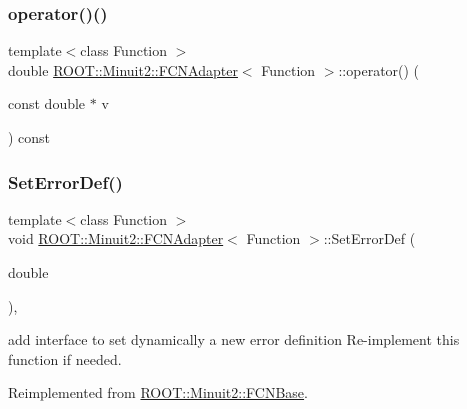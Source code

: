 \subsubsection{\texorpdfstring{operator()()}{operator()()}\hspace{0.1cm}{\footnotesize\ttfamily [4/4]}}
{\footnotesize\ttfamily template$<$class Function $>$ \\
double \mbox{\hyperlink{classROOT_1_1Minuit2_1_1FCNAdapter}{R\+O\+O\+T\+::\+Minuit2\+::\+F\+C\+N\+Adapter}}$<$ Function $>$\+::operator() (\begin{DoxyParamCaption}\item[{const double $\ast$}]{v }\end{DoxyParamCaption}) const\hspace{0.3cm}{\ttfamily [inline]}}

\mbox{\label{classROOT_1_1Minuit2_1_1FCNAdapter_ad87419db3f1d4764497f52487fef6fc8}} 
\subsubsection{\texorpdfstring{SetErrorDef()}{SetErrorDef()}\hspace{0.1cm}{\footnotesize\ttfamily [1/2]}}
{\footnotesize\ttfamily template$<$class Function $>$ \\
void \mbox{\hyperlink{classROOT_1_1Minuit2_1_1FCNAdapter}{R\+O\+O\+T\+::\+Minuit2\+::\+F\+C\+N\+Adapter}}$<$ Function $>$\+::Set\+Error\+Def (\begin{DoxyParamCaption}\item[{double}]{ }\end{DoxyParamCaption})\hspace{0.3cm}{\ttfamily [inline]}, {\ttfamily [virtual]}}

add interface to set dynamically a new error definition Re-\/implement this function if needed. 

Reimplemented from \mbox{\hyperlink{classROOT_1_1Minuit2_1_1FCNBase_a840e02c2e6ef96eec289deca096b6088}{R\+O\+O\+T\+::\+Minuit2\+::\+F\+C\+N\+Base}}.

\mbox{\label{classROOT_1_1Minuit2_1_1FCNAdapter_ad87419db3f1d4764497f52487fef6fc8}} 
